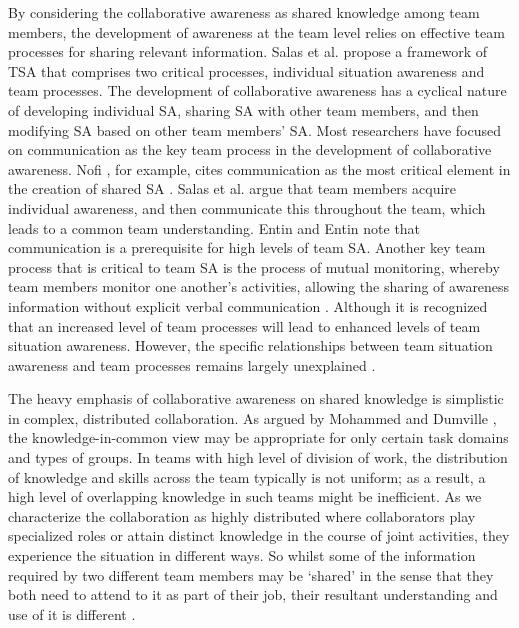 By considering the collaborative awareness as shared knowledge among team members, the development of awareness at the team level relies on effective team processes for sharing relevant information. Salas et al. \cite{salas1995situation} propose a framework of TSA that comprises two critical processes, individual situation awareness and team processes. The development of collaborative awareness has a cyclical nature of developing individual SA, sharing SA with other team members, and then modifying SA based on other team members' SA. Most researchers have focused on communication as the key team process in the development of collaborative awareness. Nofi \cite{nofi2000defining}, for example, cites communication as the most critical element in the creation of shared SA . Salas et al. \cite{salas1995situation} argue that team members acquire individual awareness, and then communicate this throughout the team, which leads to a common team understanding. Entin and Entin \cite{entin2000assessing} note that communication is a prerequisite for high levels of team SA. Another key team process that is critical to team SA is the process of mutual monitoring, whereby team members monitor one another's activities, allowing the sharing of awareness information without explicit verbal communication \cite{Gutwin2002,Salmon2008}. Although it is recognized that an increased level of team processes will lead to enhanced levels of team situation awareness. However, the specific relationships between team situation awareness and team processes remains largely unexplained \cite{Salmon2008}.

The heavy emphasis of collaborative awareness on shared knowledge is simplistic in complex, distributed collaboration. As argued by Mohammed and Dumville \cite{Mohammed2001}, the knowledge-in-common view may be appropriate for only certain task domains and types of groups. In teams with high level of division of work, the distribution of knowledge and skills across the team typically is not uniform; as a result, a high level of overlapping knowledge in such teams might be inefficient. As we characterize the collaboration as highly distributed where collaborators play specialized roles or attain distinct knowledge in the course of joint activities, they experience the situation in different ways. So whilst some of the information required by two different team members may be `shared' in the sense that they both need to attend to it as part of their job, their resultant understanding and use of it is different \cite{Salmon2010}.

